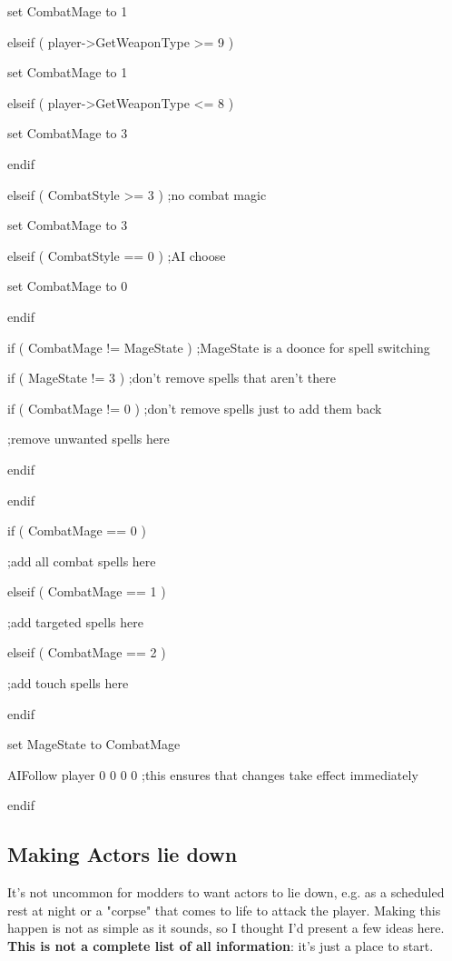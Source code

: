 set CombatMage to 1

elseif ( player-\textgreater GetWeaponType \textgreater= 9 )

set CombatMage to 1

elseif ( player-\textgreater GetWeaponType \textless= 8 )

set CombatMage to 3

endif

elseif ( CombatStyle \textgreater= 3 ) ;no combat magic

set CombatMage to 3

elseif ( CombatStyle == 0 ) ;AI choose

set CombatMage to 0

endif

if ( CombatMage != MageState ) ;MageState is a doonce for spell
switching

if ( MageState != 3 ) ;don't remove spells that aren't there

if ( CombatMage != 0 ) ;don't remove spells just to add them back

;remove unwanted spells here

endif

endif

if ( CombatMage == 0 )

;add all combat spells here

elseif ( CombatMage == 1 )

;add targeted spells here

elseif ( CombatMage == 2 )

;add touch spells here

endif

set MageState to CombatMage

AIFollow player 0 0 0 0 ;this ensures that changes take effect
immediately

endif

\hypertarget{making-actors-lie-down}{%
\subsection{Making Actors lie down}\label{making-actors-lie-down}}

It's not uncommon for modders to want actors to lie down, e.g. as a
scheduled rest at night or a "corpse" that comes to life to attack the
player. Making this happen is not as simple as it sounds, so I thought
I'd present a few ideas here. \textbf{This is not a complete list of all
information}: it's just a place to start.

